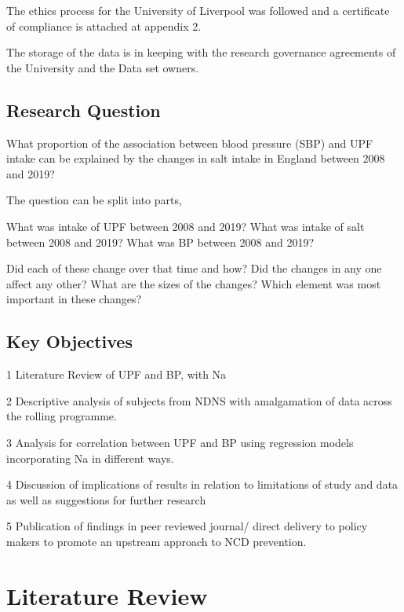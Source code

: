 \documentclass[
]{article}
\begin{document}
The ethics process for the University of Liverpool was followed and a
certificate of compliance is attached at appendix 2.

The storage of the data is in keeping with the research governance
agreements of the University and the Data set owners.

\hypertarget{research-question}{%
\subsection{Research Question}\label{research-question}}

What proportion of the association between blood pressure (SBP) and UPF
intake can be explained by the changes in salt intake in England between
2008 and 2019?

The question can be split into parts,

What was intake of UPF between 2008 and 2019? What was intake of salt
between 2008 and 2019? What was BP between 2008 and 2019?

Did each of these change over that time and how? Did the changes in any
one affect any other? What are the sizes of the changes? Which element
was most important in these changes?

\hypertarget{key-objectives}{%
\subsection{Key Objectives}\label{key-objectives}}

1 Literature Review of UPF and BP, with Na

2 Descriptive analysis of subjects from NDNS with amalgamation of data
across the rolling programme.

3 Analysis for correlation between UPF and BP using regression models
incorporating Na in different ways.

4 Discussion of implications of results in relation to limitations of
study and data as well as suggestions for further research

5 Publication of findings in peer reviewed journal/ direct delivery to
policy makers to promote an upstream approach to NCD prevention.

\newpage

\hypertarget{literature-review}{%
\section{Literature Review}\label{literature-review}}
\end{document}
